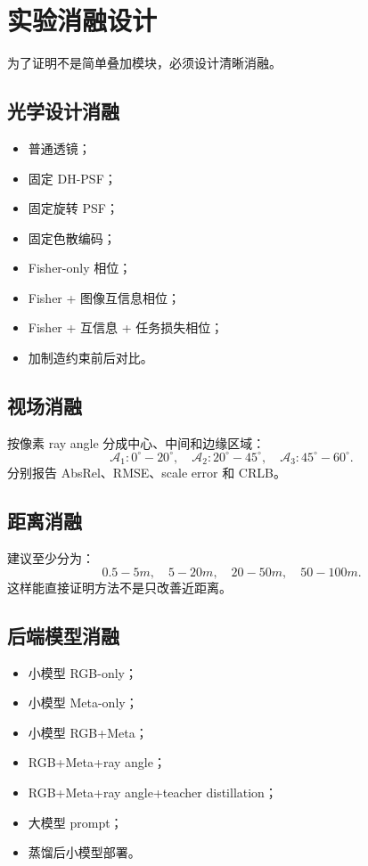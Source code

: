 \documentclass[11pt,a4paper,fontset=none]{ctexart}
\begin{document}
\section{实验消融设计}

为了证明不是简单叠加模块，必须设计清晰消融。

\subsection{光学设计消融}

\begin{itemize}
  \item 普通透镜；
  \item 固定 DH-PSF；
  \item 固定旋转 PSF；
  \item 固定色散编码；
  \item Fisher-only 相位；
  \item Fisher + 图像互信息相位；
  \item Fisher + 互信息 + 任务损失相位；
  \item 加制造约束前后对比。
\end{itemize}

\subsection{视场消融}

按像素 ray angle 分成中心、中间和边缘区域：
\begin{equation}
  \mathcal A_1:0^\circ\!-\!20^\circ,\quad
  \mathcal A_2:20^\circ\!-\!45^\circ,\quad
  \mathcal A_3:45^\circ\!-\!60^\circ.
\end{equation}
分别报告 AbsRel、RMSE、scale error 和 CRLB。

\subsection{距离消融}

建议至少分为：
\begin{equation}
  0.5\!-\!5m,\quad 5\!-\!20m,\quad 20\!-\!50m,\quad 50\!-\!100m.
\end{equation}
这样能直接证明方法不是只改善近距离。

\subsection{后端模型消融}

\begin{itemize}
  \item 小模型 RGB-only；
  \item 小模型 Meta-only；
  \item 小模型 RGB+Meta；
  \item RGB+Meta+ray angle；
  \item RGB+Meta+ray angle+teacher distillation；
  \item 大模型 prompt；
  \item 蒸馏后小模型部署。
\end{itemize}
\end{document}

